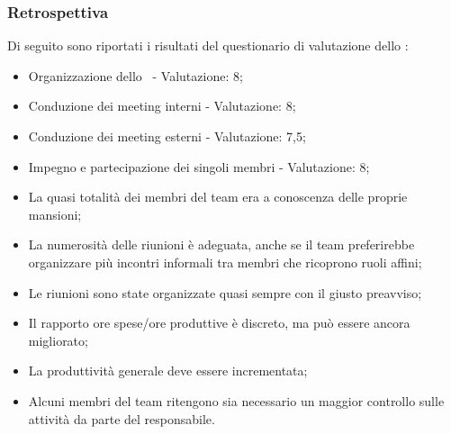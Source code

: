 \subsubsection{Retrospettiva}

\par Di seguito sono riportati i risultati del questionario di valutazione dello :
\begin{itemize}
  \item Organizzazione dello \ - Valutazione: 8;
  \item Conduzione dei meeting interni - Valutazione: 8;
  \item Conduzione dei meeting esterni - Valutazione: 7,5;
  \item Impegno e partecipazione dei singoli membri - Valutazione: 8;
  \item La quasi totalità dei membri del team era a conoscenza delle proprie mansioni;
  \item La numerosità delle riunioni è adeguata, anche se il team preferirebbe organizzare più incontri informali tra membri che ricoprono ruoli affini;
  \item Le riunioni sono state organizzate quasi sempre con il giusto preavviso;
  \item Il rapporto ore spese/ore produttive è discreto, ma può essere ancora migliorato;
  \item La produttività generale deve essere incrementata;
  \item Alcuni membri del team ritengono sia necessario un maggior controllo sulle attività da parte del responsabile.
\end{itemize}

